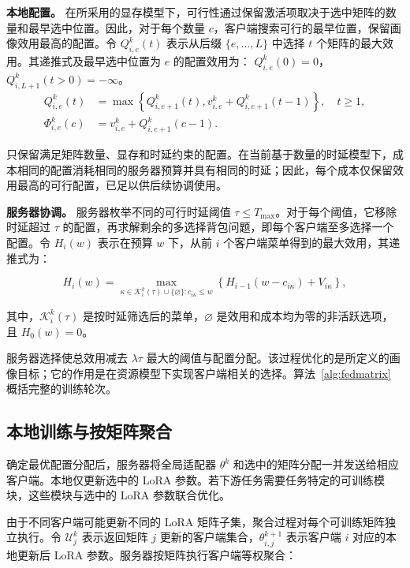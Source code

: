 \documentclass[10pt,conference,letterpaper]{IEEEtran}
\begin{document}
\noindent\textbf{本地配置。}
在所采用的显存模型下，可行性通过保留激活项取决于选中矩阵的数量和最早选中位置。因此，对于每个数量 $c$，客户端搜索可行的最早位置，保留画像效用最高的配置。令 $Q_{i,e}^k(t)$ 表示从后缀 $\{e,\ldots,L\}$ 中选择 $t$ 个矩阵的最大效用。其递推式及最早选中位置为 $e$ 的配置效用为：
\(Q_{i,e}^k(0)=0\)，\(Q_{i,L+1}^k(t>0)=-\infty\)。
\begin{equation}
 \begin{aligned}
 Q_{i,e}^k(t)&=\max\left\{Q_{i,e+1}^k(t),v_{i,e}^k+Q_{i,e+1}^k(t-1)\right\},\quad t\ge1,
 \\
 \Phi_{i,e}^k(c)&=v_{i,e}^k+Q_{i,e+1}^k(c-1).
 \end{aligned}
 \label{eq:client-dp}
\end{equation}

只保留满足矩阵数量、显存和时延约束的配置。在当前基于数量的时延模型下，成本相同的配置消耗相同的服务器预算并具有相同的时延；因此，每个成本仅保留效用最高的可行配置，已足以供后续协调使用。

\noindent\textbf{服务器协调。}
服务器枚举不同的可行时延阈值 $\tau\le T_{\max}$。对于每个阈值，它移除时延超过 $\tau$ 的配置，再求解剩余的多选择背包问题，即每个客户端至多选择一个配置。令 $H_i(w)$ 表示在预算 $w$ 下，从前 $i$ 个客户端菜单得到的最大效用，其递推式为：

\begin{equation}
 H_i(w)=
 \max_{\kappa\in
 \mathcal K_i^k(\tau)\cup\{\varnothing\}:c_{i\kappa}\le w}
 \left\{
 H_{i-1}(w-c_{i\kappa})
 +
 V_{i\kappa}
 \right\},
 \label{eq:server-dp}
\end{equation}

其中，$\mathcal K_i^k(\tau)$ 是按时延筛选后的菜单，$\varnothing$ 是效用和成本均为零的非活跃选项，且 $H_0(w)=0$。

服务器选择使总效用减去 $\lambda\tau$ 最大的阈值与配置分配。该过程优化的是所定义的画像目标；它的作用是在资源模型下实现客户端相关的选择。算法~\ref{alg:fedmatrix} 概括完整的训练轮次。

\subsection{本地训练与按矩阵聚合}

确定最优配置分配后，服务器将全局适配器 \(\theta^k\) 和选中的矩阵分配一并发送给相应客户端。本地仅更新选中的 LoRA 参数。若下游任务需要任务特定的可训练模块，这些模块与选中的 LoRA 参数联合优化。

由于不同客户端可能更新不同的 LoRA 矩阵子集，聚合过程对每个可训练矩阵独立执行。令 \(\mathcal U_j^k\) 表示返回矩阵 \(j\) 更新的客户端集合，\(\theta_{i,j}^{k+1}\) 表示客户端 \(i\) 对应的本地更新后 LoRA 参数。服务器按矩阵执行客户端等权聚合：
\end{document}
